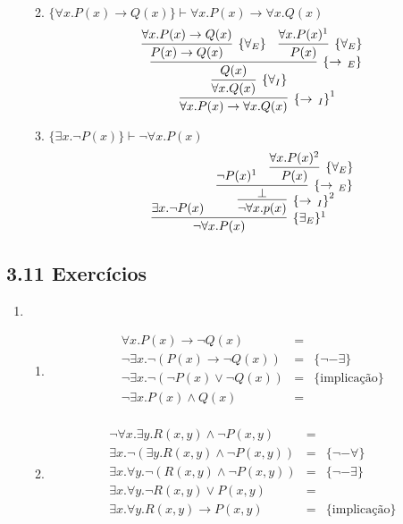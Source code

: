 \begin{enumerate}
\begin{enumerate}
\[{                    }
               \]
			\item $\{\forall x. P(x) \to Q(x)\} \vdash \forall x. P(x) \to \forall x. Q(x)$
				\[
				\infer[\impI^1]
					{\forall x. P(x) \to \forall x. Q(x)}
					{
						\infer[\{\forall_I\}]
							{\forall x . Q(x)}
							{
								\infer[\impE]
									{Q(x)}
									{
										\infer[\{\forall_E\}]
											{P(x) \to Q(x)}
											{\forall x. P(x) \to Q(x)}
										&
										\infer[\{\forall_E\}]
											{P(x)}
											{\forall x. P(x)^1}
									}
							}
					}
				\]
			\item $\{\exists x. \neg P(x)\} \vdash \neg \forall x. P(x)$
				\[
					\infer[\{\exists_E\}^1]
						{\neg \forall x. P(x)}
						{
							\exists x. \neg P(x)
							&
							\infer[\impI^2]
								{\neg \forall x. p(x)}
								{
									\infer[\impE]
										{\bot}
										{
											\neg P(x)^1
											&
											\infer[\{\forall_E\}]
												{P(x)}
												{\forall x. P(x)^2}
										}
								}
						}
				\]
		\end{enumerate}
	\end{enumerate}
	
\subsection{3.11 Exerc\'icios}
	
		\begin{enumerate}
			\item 
			\begin{enumerate}
				\item
				\[
				   \begin{array}{lcl}
				   	  \forall x. P(x) \to \neg Q(x) & = & \\
				   	  \neg \exists x. \neg(P(x) \to \neg Q(x)) & = & \{\neg-\exists\} \\
				   	  \neg \exists x. \neg(\neg P(x) \lor \neg Q(x)) & = & \{\text{implica\c{c}\~ao}\} \\
				   	  \neg \exists x. P(x) \land Q(x) & = & \\
				   \end{array}
				\]
				\item
				\[
				   \begin{array}{lcl}
				   	  \neg \forall x.\exists y.R(x, y) \land \neg P(x, y) & = & \\
				   	  \exists x. \neg(\exists y. R(x, y) \land \neg P(x, y)) & = & \{\neg-\forall\} \\
				   	  \exists x. \forall y.\neg(R (x, y) \land \neg P(x, y)) & = & \{\neg-\exists\}\\
				   	  \exists x. \forall y. \neg R(x, y) \lor P (x, y) & = & \\
				   	  \exists x. \forall y. R(x, y) \to P(x, y) & = & \{\text{implica\c{c}\~ao}\} \\
				   \end{array}
				\]
			\end{enumerate}
		\end{enumerate}
	